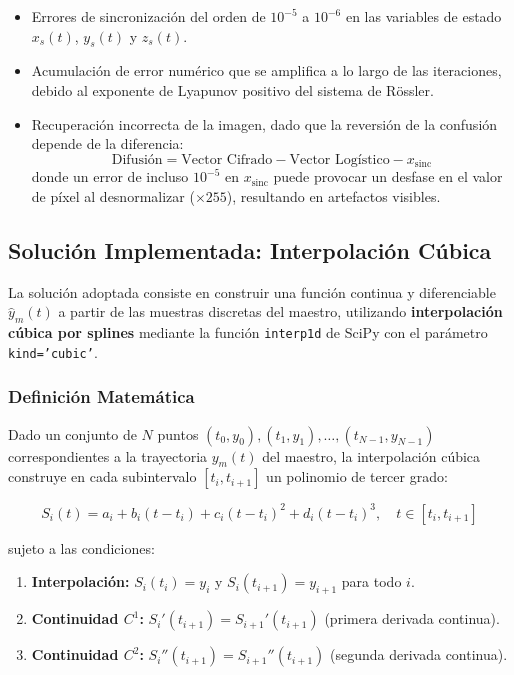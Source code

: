 \documentclass[12pt,a4paper]{article}
\begin{document}
	\begin{itemize}
		\item Errores de sincronización del orden de $10^{-5}$ a $10^{-6}$ en las variables de estado $x_s(t)$, $y_s(t)$ y $z_s(t)$.
		\item Acumulación de error numérico que se amplifica a lo largo de las iteraciones, debido al exponente de Lyapunov positivo del sistema de Rössler.
		\item Recuperación incorrecta de la imagen, dado que la reversión de la confusión depende de la diferencia:
		$$\text{Difusión} = \text{Vector Cifrado} - \text{Vector Logístico} - x_{\text{sinc}}$$
		donde un error de incluso $10^{-5}$ en $x_{\text{sinc}}$ puede provocar un desfase en el valor de píxel al desnormalizar ($\times 255$), resultando en artefactos visibles.
	\end{itemize}
	
	\subsection{Solución Implementada: Interpolación Cúbica}
	
	La solución adoptada consiste en construir una función continua y diferenciable $\hat{y}_m(t)$ a partir de las muestras discretas del maestro, utilizando \textbf{interpolación cúbica por splines} mediante la función \texttt{interp1d} de SciPy con el parámetro \texttt{kind='cubic'}.
	
	\subsubsection{Definición Matemática}
	
	Dado un conjunto de $N$ puntos $(t_0, y_0), (t_1, y_1), \ldots, (t_{N-1}, y_{N-1})$ correspondientes a la trayectoria $y_m(t)$ del maestro, la interpolación cúbica construye en cada subintervalo $[t_i, t_{i+1}]$ un polinomio de tercer grado:
	
	$$S_i(t) = a_i + b_i(t - t_i) + c_i(t - t_i)^2 + d_i(t - t_i)^3, \quad t \in [t_i, t_{i+1}]$$
	
	sujeto a las condiciones:
	
	\begin{enumerate}
		\item \textbf{Interpolación:} $S_i(t_i) = y_i$ y $S_i(t_{i+1}) = y_{i+1}$ para todo $i$.
		\item \textbf{Continuidad $C^1$:} $S_i'(t_{i+1}) = S_{i+1}'(t_{i+1})$ (primera derivada continua).
		\item \textbf{Continuidad $C^2$:} $S_i''(t_{i+1}) = S_{i+1}''(t_{i+1})$ (segunda derivada continua).
	\end{enumerate}
	
\end{document}
